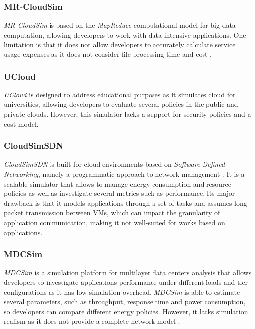 {\subsubsection*{MR-CloudSim}
\emph{MR-CloudSim} \cite{jung2012mr} is based on the \emph{MapReduce} computational model \cite{dean2008mapreduce} for big data computation, allowing developers to work with data-intensive applications. One limitation is that it does not allow developers to accurately calculate service usage expenses as it does not consider file processing time and cost \cite{mansouri2020cloud}.
\subsubsection*{UCloud}
\emph{UCloud} \cite{sqalli2012ucloud} is designed to address educational purposes as it simulates cloud for universities, allowing developers to evaluate several policies in the public and private clouds. However, this simulator lacks a support for security policies and a cost model. \cite{mansouri2020cloud}
\subsubsection*{CloudSimSDN}
\emph{CloudSimSDN} \cite{son2015cloudsimsdn} is built for cloud environments based on \emph{Software Defined Networking}, namely a programmatic approach to network management \cite{benzekki2016software}. It is a scalable simulator that allows to manage energy consumption and resource policies as well as investigate several metrics such as performance. Its major drawback is that it models applications through a set of tasks and assumes long packet transmission between VMs, which can impact the granularity of application communication, making it not well-suited for works based on applications. \cite{khalil2017cloud} \cite{abreu2020comparative}
\subsubsection*{MDCSim}
\emph{MDCSim} \cite{lim2009mdcsim} is a simulation platform for multilayer data centers analysis that allows developers to investigate applications performance under different loads and tier configurations as it has low simulation overhead. \emph{MDCSim} is able to estimate several parameters, such as throughput, response time and power consumption, so developers can compare different energy policies. However, it lacks simulation realism as it does not provide a complete network model \cite{mansouri2020cloud} \cite{patel2016comprehensive}.
}
